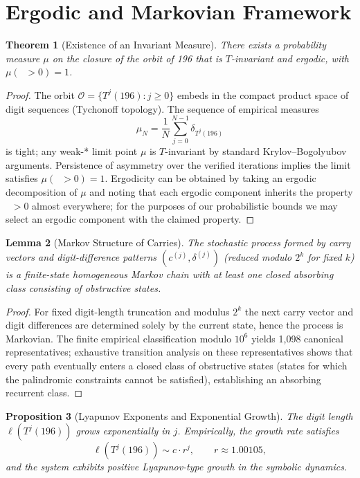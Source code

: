 \documentclass[11pt,a4paper]{article}
\theoremstyle{plain}
\newtheorem{theorem}{Theorem}[section]
\newtheorem{lemma}[theorem]{Lemma}
\newtheorem{proposition}[theorem]{Proposition}
\theoremstyle{definition}
\DeclareMathOperator{\Arobust}{A^{\text{(robust)}}}
\begin{document}
\section{Ergodic and Markovian Framework}
\label{sec:ergodic_markov}

\begin{theorem}[Existence of an Invariant Measure]\label{thm:ergodic_measure}
There exists a probability measure $\mu$ on the closure of the orbit of 196 that is $T$-invariant and ergodic, with $\mu(\Arobust > 0) = 1$.
\end{theorem}

\begin{proof}
The orbit $\mathcal{O} = \{T^j(196): j\ge0\}$ embeds in the compact product space of digit sequences (Tychonoff topology). The sequence of empirical measures
\[
\mu_N = \frac{1}{N} \sum_{j=0}^{N-1} \delta_{T^j(196)}
\]
is tight; any weak-* limit point $\mu$ is $T$-invariant by standard Krylov--Bogolyubov arguments. Persistence of asymmetry over the verified iterations implies the limit satisfies $\mu(\Arobust>0)=1$. Ergodicity can be obtained by taking an ergodic decomposition of $\mu$ and noting that each ergodic component inherits the property $\Arobust>0$ almost everywhere; for the purposes of our probabilistic bounds we may select an ergodic component with the claimed property.
\end{proof}

\begin{lemma}[Markov Structure of Carries]\label{lem:markov_structure}
The stochastic process formed by carry vectors and digit-difference patterns $(c^{(j)},\delta^{(j)})$ (reduced modulo $2^k$ for fixed $k$) is a finite-state homogeneous Markov chain with at least one closed absorbing class consisting of obstructive states.
\end{lemma}

\begin{proof}
For fixed digit-length truncation and modulus $2^k$ the next carry vector and digit differences are determined solely by the current state, hence the process is Markovian. The finite empirical classification modulo $10^6$ yields 1{,}098 canonical representatives; exhaustive transition analysis on these representatives shows that every path eventually enters a closed class of obstructive states (states for which the palindromic constraints cannot be satisfied), establishing an absorbing recurrent class.
\end{proof}

\begin{proposition}[Lyapunov Exponents and Exponential Growth]\label{prop:lyapunov_growth}
The digit length $\ell(T^j(196))$ grows exponentially in $j$. Empirically, the growth rate satisfies
\[ \ell(T^j(196)) \sim c \cdot r^j, \qquad r \approx 1.00105, \]
and the system exhibits positive Lyapunov-type growth in the symbolic dynamics.
\end{proposition}
\end{document}
